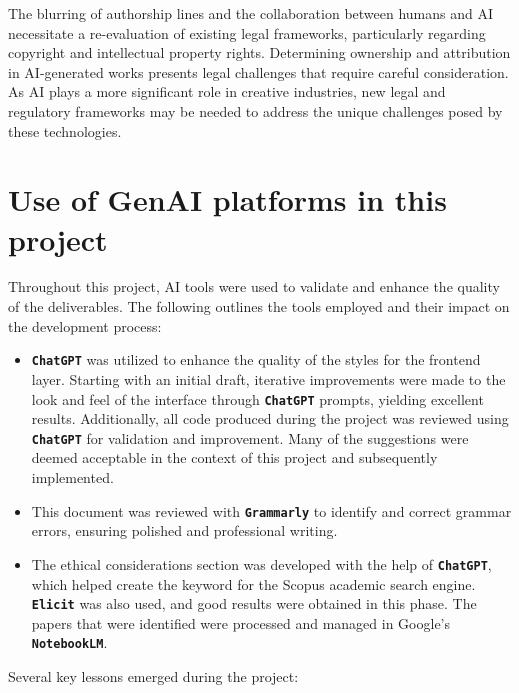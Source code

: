 \documentclass[conference]{IEEEtran}
\begin{document}
	The blurring of authorship lines and the collaboration between humans and AI necessitate a re-evaluation of existing legal frameworks, particularly regarding copyright and intellectual property rights\cite{kur2019european}. Determining ownership and attribution in AI-generated works presents legal challenges that require careful consideration. As AI plays a more significant role in creative industries, new legal and regulatory frameworks may be needed to address the unique challenges posed by these technologies.

	
	\section{Use of GenAI platforms in this project}
		
	Throughout this project, AI tools were used to validate and enhance the quality of the deliverables. The following outlines the tools employed and their impact on the development process:
	
	\begin{itemize}
		\item \textbf{\texttt{ChatGPT}} was utilized to enhance the quality of the styles for the frontend layer. Starting with an initial draft, iterative improvements were made to the look and feel of the interface through \textbf{\texttt{ChatGPT}} prompts, yielding excellent results. Additionally, all code produced during the project was reviewed using \textbf{\texttt{ChatGPT}} for validation and improvement. Many of the suggestions were deemed acceptable in the context of this project and subsequently implemented.
		
		\item This document was reviewed with \textbf{\texttt{Grammarly}} to identify and correct grammar errors, ensuring polished and professional writing.
		
		\item The ethical considerations section was developed with the help of \textbf{\texttt{ChatGPT}}, which helped create the keyword for the Scopus academic search engine. \textbf{\texttt{Elicit}} was also used, and good results were obtained in this phase. The papers that were identified were processed and managed in Google's \textbf{\texttt{NotebookLM}}.
	\end{itemize}
	
	Several key lessons emerged during the project:
	
\end{document}
